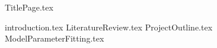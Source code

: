 \documentclass[10pt,a4paper]{article}
\begin{document}
{TitlePage.tex}
\newpage

{introduction.tex}
{LiteratureReview.tex}
{ProjectOutline.tex}
{ModelParameterFitting.tex}

\printbibliography
\end{document}

